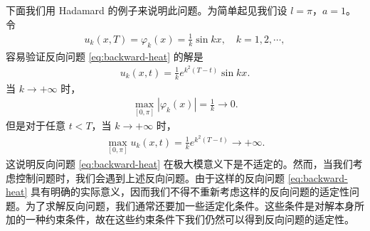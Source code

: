 \documentclass[../../main.tex]{subfiles}%
\begin{document}
下面我们用 Hadamard 的例子来说明此问题。为简单起见我们设 $l=\pi$，$a=1$。令
\begin{align*}
u_k(x,T)=\varphi_k(x)=\frac{1}{k}\sin kx,\quad k=1,2,\cdots,
\end{align*}
容易验证反向问题 \eqref{eq:backward-heat} 的解是
\begin{align*}
u_k(x,t)=\frac{1}{k}e^{k^2(T-t)}\sin kx.
\end{align*}
当 $k\to+\infty$ 时，
\begin{align*}
\max_{[0,\pi]}|\varphi_k(x)|=\frac{1}{k}\to 0.
\end{align*}
但是对于任意 $t<T$，当 $k\to+\infty$ 时，
\begin{align*}
\max_{[0,\pi]}u_k(x,t)=\frac{1}{k}e^{k^2(T-t)}\to+\infty.
\end{align*}
这说明反向问题 \eqref{eq:backward-heat} 在极大模意义下是不适定的。然而，当我们考虑控制问题时，我们会遇到上述反向问题。由于这样的反向问题 \eqref{eq:backward-heat} 具有明确的实际意义，因而我们不得不重新考虑这样的反向问题的适定性问题。为了求解反向问题，我们通常还要加一些适定化条件。这些条件是对解本身所加的一种约束条件，故在这些约束条件下我们仍然可以得到反向问题的适定性。
\end{document}
